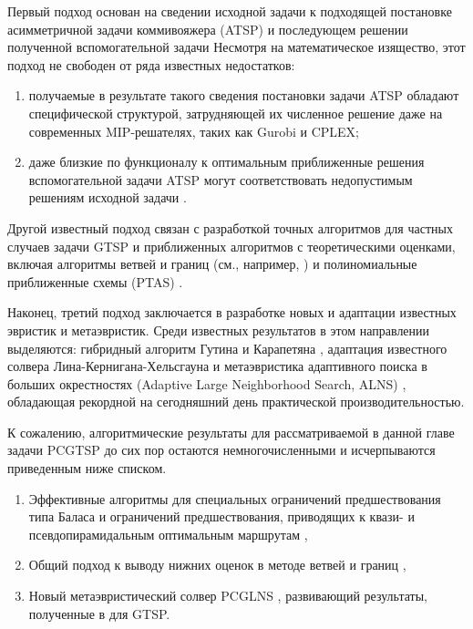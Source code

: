 Первый подход основан на сведении исходной задачи
к подходящей постановке асимметричной задачи коммивояжера
(ATSP)
и последующем решении полученной вспомогательной задачи
\cite{LaporteSemet1999,NoonBean1993}
Несмотря на математическое изящество, этот подход не свободен от ряда известных недостатков:
\begin{enumerate}
  \item
  получаемые в результате такого сведения постановки задачи ATSP
  обладают специфической структурой,
  затрудняющей их численное решение даже на современных MIP-решателях,
  таких как Gurobi и CPLEX;
  \item
  даже близкие по функционалу к оптимальным
  приближенные решения вспомогательной задачи ATSP
  могут соответствовать недопустимым решениям исходной задачи
  \cite{KaraGut2012}.
\end{enumerate}

Другой известный подход связан
с разработкой точных алгоритмов для частных случаев задачи GTSP
и приближенных алгоритмов с теоретическими оценками,
включая алгоритмы ветвей и границ
(см., например, \cite{FishGonToth1997, Yuan2020})
и полиномиальные приближенные схемы (PTAS)
\cite{FerGriSit2006, KhN-PSIM2017}.

Наконец,
третий подход заключается в разработке
новых и адаптации известных эвристик и метаэвристик.
Среди известных результатов в этом направлении выделяются:
гибридный алгоритм Гутина и Карапетяна \cite{Gutin-2010},
адаптация известного солвера Лина-Кернигана-Хельсгауна \cite{Helsgaun-2015}
и метаэвристика адаптивного поиска в больших окрестностях
(Adaptive Large Neighborhood Search, ALNS)
\cite{SMITH20171},
обладающая рекордной на сегодняшний день практической производительностью.

К сожалению,
алгоритмические результаты для рассматриваемой
в данной главе задачи PCGTSP
до сих пор остаются немногочисленными и исчерпываются
приведенным ниже списком.
\begin{enumerate}
  \item
  Эффективные алгоритмы для специальных ограничений предшествования
  типа Баласа
  \cite{Balas-Sim2001, ChenKhKh2016, CKK-IFAC2016}
  и ограничений предшествования, приводящих к
  квази- и псевдопирамидальным оптимальным маршрутам
  \cite{KhN-OPTA2018,KhN-AMAI-2020},
  \item
  Общий подход к выводу нижних оценок в методе ветвей и границ
  \cite{SALMAN2020163},
  \item
  Новый метаэвристический солвер PCGLNS
  \cite{KKP-optima2020, bi:PCGLNS},
  развивающий результаты, полученные в
  \cite{SMITH20171}
  для GTSP.
\end{enumerate}
